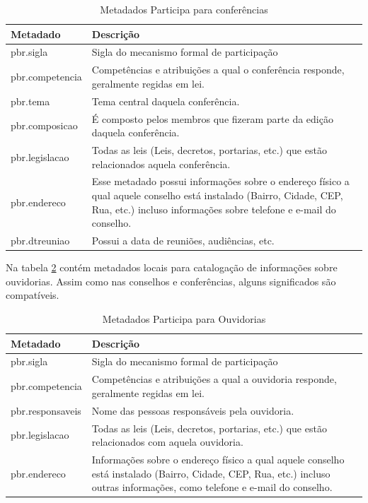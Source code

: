 \begin{table}[H]
\begin{center}
    \begin{tabular}{ | l | p{10cm} |}
    \hline
    \textbf{Metadado} & \textbf{Descrição} \\ \hline
    pbr.sigla & Sigla do mecanismo formal de participação \\ \hline
    pbr.competencia & Competências e atribuições a qual o conferência responde, geralmente regidas em lei. \\ \hline
    pbr.tema & Tema central daquela conferência. \\ \hline
    pbr.composicao & É composto pelos membros que fizeram parte da edição daquela conferência. \\ \hline
    pbr.legislacao & Todas as leis (Leis, decretos, portarias, etc.) que estão relacionados aquela conferência. \\ \hline
    pbr.endereco & Esse metadado possui informações sobre o endereço físico a qual aquele conselho está instalado (Bairro, Cidade, CEP, Rua, etc.) incluso informações sobre telefone e e-mail do conselho. \\ \hline
    pbr.dtreuniao & Possui a data de reuniões, audiências, etc. \\ \hline
    \end{tabular}
    \caption{Metadados Participa para conferências}
    \label{tab:metadata_pbr_conferencias}
\end{center}
\end{table}


Na tabela \ref{tab:metadata_pbr_ouvidorias} contém metadados locais para catalogação de informações sobre ouvidorias. Assim como nas conselhos e conferências, alguns significados são compatíveis.

\begin{table}[H]
\begin{center}
    \begin{tabular}{ | l | p{10cm} |}
    \hline
    \textbf{Metadado} & \textbf{Descrição} \\ \hline
    pbr.sigla & Sigla do mecanismo formal de participação \\ \hline
    pbr.competencia & Competências e atribuições a qual a ouvidoria responde, geralmente regidas em lei. \\ \hline
    pbr.responsaveis & Nome das pessoas responsáveis pela ouvidoria. \\ \hline
    pbr.legislacao & Todas as leis (Leis, decretos, portarias, etc.) que estão relacionados com aquela ouvidoria. \\ \hline
    pbr.endereco & Informações sobre o endereço físico a qual aquele conselho está instalado (Bairro, Cidade, CEP, Rua, etc.) incluso outras informações, como telefone e e-mail do conselho. \\ \hline
    \end{tabular}
    \caption{Metadados Participa para Ouvidorias}
    \label{tab:metadata_pbr_ouvidorias}
\end{center}
\end{table}

